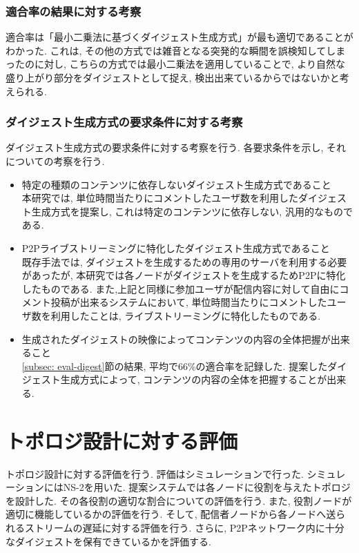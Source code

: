 \subsubsection{適合率の結果に対する考察}
適合率は「最小二乗法に基づくダイジェスト生成方式」が最も適切であることがわかった. これは, その他の方式では雑音となる突発的な瞬間を誤検知してしまったのに対し, こちらの方式では最小二乗法を適用していることで, より自然な盛り上がり部分をダイジェストとして捉え, 検出出来ているからではないかと考えられる.

\subsubsection{ダイジェスト生成方式の要求条件に対する考察}
ダイジェスト生成方式の要求条件に対する考察を行う. 各要求条件を示し, それについての考察を行う.

\begin{itemize}
\item 特定の種類のコンテンツに依存しないダイジェスト生成方式であること \\
本研究では, 単位時間当たりにコメントしたユーザ数を利用したダイジェスト生成方式を提案し, これは特定のコンテンツに依存しない, 汎用的なものである.
\item P2Pライブストリーミングに特化したダイジェスト生成方式であること \\
既存手法では, ダイジェストを生成するための専用のサーバを利用する必要があったが, 本研究では各ノードがダイジェストを生成するためP2Pに特化したものである. また,上記と同様に参加ユーザが配信内容に対して自由にコメント投稿が出来るシステムにおいて, 単位時間当たりにコメントしたユーザ数を利用したことは, ライブストリーミングに特化したものである.
\item 生成されたダイジェストの映像によってコンテンツの内容の全体把握が出来ること \\
\ref{subsec: eval-digest}節の結果, 平均で66\%の適合率を記録した. 提案したダイジェスト生成方式によって, コンテンツの内容の全体を把握することが出来る.
\end{itemize}

\newpage

\section{トポロジ設計に対する評価}
トポロジ設計に対する評価を行う. 評価はシミュレーションで行った. シミュレーションにはNS-2を用いた. 提案システムでは各ノードに役割を与えたトポロジを設計した. その各役割の適切な割合についての評価を行う. また, 役割ノードが適切に機能しているかの評価を行う. そして, 配信者ノードから各ノードへ送られるストリームの遅延に対する評価を行う. さらに, P2Pネットワーク内に十分なダイジェストを保有できているかを評価する.

